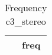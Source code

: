 \begin{table}[htbp]\centering
\def\sym#1{\ifmmode^{#1}\else\(^{#1}\)\fi}
\caption{Frequency c3\_stereo \label{tab:"label"}}
\begin{tabular*}{0.9\hsize}{@{\hskip\tabcolsep\extracolsep\fill}l*{1}{c}}
\toprule
                                &     freq\\
\midrule
\bottomrule
\end{tabular*}
\end{table}
